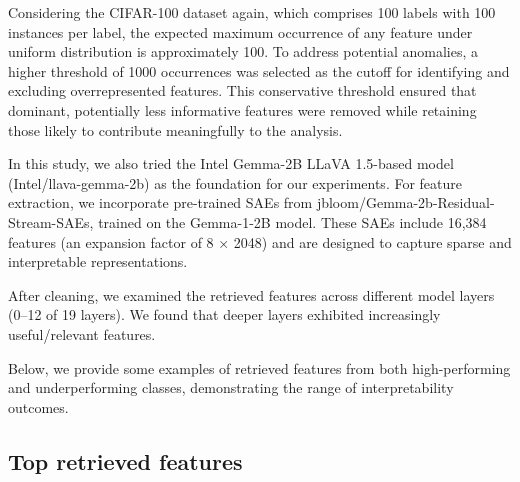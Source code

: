 Considering the CIFAR-100 dataset again, which comprises 100 labels with 100 instances per label, the expected maximum occurrence of any feature under uniform distribution is approximately 100. To address potential anomalies, a higher threshold of 1000 occurrences was selected as the cutoff for identifying and excluding overrepresented features. This conservative threshold ensured that dominant, potentially less informative features were removed while retaining those likely to contribute meaningfully to the analysis.

In this study, we also tried the Intel Gemma-2B LLaVA 1.5-based model (Intel/llava-gemma-2b) \cite{hinck2024llavagemma} as the foundation for our experiments. For feature extraction, we incorporate pre-trained SAEs from jbloom/Gemma-2b-Residual-Stream-SAEs, trained on the Gemma-1-2B model. These SAEs include 16,384 features (an expansion factor of 8 × 2048) and are designed to capture sparse and interpretable representations.

After cleaning, we examined the retrieved features across different model layers (0–12 of 19 layers). We found that deeper layers exhibited increasingly useful/relevant features.

Below, we provide some examples of retrieved features from both high-performing and underperforming classes, demonstrating the range of interpretability outcomes.

\subsection{Top retrieved features}
\label{app:multimodal_retrieve}

